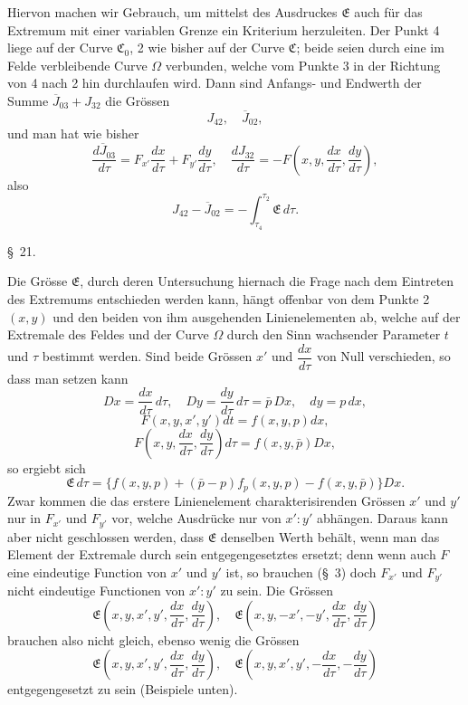 \documentclass[11pt,a4paper,leqno]{article}
\begin{document}
 Hiervon machen wir Gebrauch, um mittelst des Ausdruckes $\mathfrak{E}$ auch für das Extremum mit einer variablen Grenze ein Kriterium herzuleiten. Der Punkt 4 liege auf der Curve $\mathfrak{C}_0$, 2 wie bisher auf der Curve $\mathfrak{C}$; beide seien durch eine im Felde verbleibende Curve $\Omega$ verbunden, welche vom Punkte 3 in der Richtung von 4 nach 2 hin durchlaufen wird. Dann sind Anfangs- und Endwerth der Summe $\overline{J}_{03}+J_{32}$ die Grössen
\[
J_{42},\quad \overline{J}_{02},
\]
und man hat wie bisher
\[
\frac{d\overline{J}_{03}}{d\tau}
=
F_{x'}\frac{dx}{d\tau}
+F_{y'}\frac{dy}{d\tau},
\quad
\frac{dJ_{32}}{d\tau}
=
-F\left(x,y,\frac{dx}{d\tau},\frac{dy}{d\tau}\right),
\]
also
\begin{equation}\tag{57}
J_{42}-\overline{J}_{02}
=
-\int_{\tau_4}^{\tau_2}\mathfrak{E}\,d\tau.
\end{equation}





\begin{center}{\large \S~21.}\end{center}

Die Grösse $\mathfrak{E}$, durch deren Untersuchung hiernach die Frage nach dem Eintreten des Extremums entschieden werden kann, hängt offenbar von dem Punkte 2 $(x,y)$ und den beiden von ihm ausgehenden Linienelementen ab, welche auf der Extremale des Feldes und der Curve $\Omega$ durch den Sinn wachsender Parameter $t$ und $\tau$ bestimmt werden. Sind beide Grössen $x'$ und $\dfrac{dx}{d\tau}$ von Null verschieden, so dass man setzen kann
\[
D x=\frac{dx}{d\tau}\,d\tau,\quad
D y=\frac{dy}{d\tau}\,d\tau=\bar{p}\,D x,\quad
dy=p\,dx,
\]
\[
F(x,y,x',y')dt=f(x,y,p)dx,
\]
\[
F\left(x,y,\frac{dx}{d\tau},\frac{dy}{d\tau}\right)d\tau
=
f(x,y,\bar{p})D x,
\]
so ergiebt sich
\begin{equation}\tag{58}
\mathfrak{E}\,d\tau
=
\{f(x,y,p)+(\bar{p}-p)f_p(x,y,p)-f(x,y,\bar{p})\}D x.
\end{equation}
Zwar kommen die das erstere Linienelement charakterisirenden Grössen $x'$ und $y'$ nur in $F_{x'}$ und $F_{y'}$ vor, welche Ausdrücke nur von $x':y'$ abhängen. Daraus kann aber nicht geschlossen werden, dass $\mathfrak{E}$ denselben Werth behält, wenn man das Element der Extremale durch sein entgegengesetztes ersetzt; denn wenn auch $F$ eine eindeutige Function von $x'$ und $y'$ ist, so brauchen (\S~3) doch $F_{x'}$ und $F_{y'}$ nicht eindeutige Functionen von $x':y'$ zu sein. Die Grössen
\[
\mathfrak{E}\left(x,y,x',y',\frac{dx}{d\tau},\frac{dy}{d\tau}\right),\quad
\mathfrak{E}\left(x,y,-x',-y',\frac{dx}{d\tau},\frac{dy}{d\tau}\right)
\]
brauchen also nicht gleich, ebenso wenig die Grössen
\[
\mathfrak{E}\left(x,y,x',y',\frac{dx}{d\tau},\frac{dy}{d\tau}\right),\quad
\mathfrak{E}\left(x,y,x',y',-\frac{dx}{d\tau},-\frac{dy}{d\tau}\right)
\]
entgegengesetzt zu sein (Beispiele unten).
\end{document}
